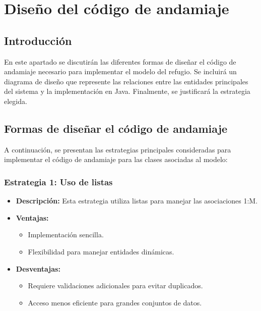 \section{Diseño del código de andamiaje}

\subsection{Introducción}
En este apartado se discutirán las diferentes formas de diseñar el código de andamiaje necesario para implementar el modelo del refugio. Se incluirá un diagrama de diseño que represente las relaciones entre las entidades principales del sistema y la implementación en Java. Finalmente, se justificará la estrategia elegida.

\subsection{Formas de diseñar el código de andamiaje}
A continuación, se presentan las estrategias principales consideradas para implementar el código de andamiaje para las clases asociadas al modelo:

\subsubsection{Estrategia 1: Uso de listas}
\begin{itemize}
    \item \textbf{Descripción:} Esta estrategia utiliza listas para manejar las asociaciones 1:M.
    \item \textbf{Ventajas:}
    \begin{itemize}
        \item Implementación sencilla.
        \item Flexibilidad para manejar entidades dinámicas.
    \end{itemize}
    \item \textbf{Desventajas:}
    \begin{itemize}
        \item Requiere validaciones adicionales para evitar duplicados.
        \item Acceso menos eficiente para grandes conjuntos de datos.
    \end{itemize}
\end{itemize}


